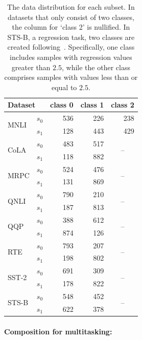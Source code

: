\begin{table}[]
\caption{The data distribution for each subset. 
In datasets that only consist of two classes, the column for `class 2' is nullified.
In STS-B, a regression task, two classes are created following~\citet{matena2022merging}.
Specifically, one class includes samples with regression values greater than $2.5$, while the other class comprises samples with values less than or equal to $2.5$. 
}
\label{table:split0}
\centering
\begin{tabular}{llrrr}
\toprule
\multicolumn{2}{l}{Dataset} & class 0 & class 1 & class 2 \\ \midrule
\multirow{2}{*}{MNLI} & $s_0$ & 536 & 226 & 238 \\
 & $s_1$ & 128 & 443 & 429 \\
\multirow{2}{*}{CoLA} & $s_0$ & 483 & 517 & \multicolumn{1}{c}{\multirow{2}{*}{--}} \\
 & $s_1$ & 118 & 882 &  \\
\multirow{2}{*}{MRPC} & $s_0$ & 524 & 476 & \multicolumn{1}{c}{\multirow{2}{*}{--}} \\
 & $s_1$ & 131 & 869 &  \\
\multirow{2}{*}{QNLI} & $s_0$ & 790 & 210 & \multicolumn{1}{c}{\multirow{2}{*}{--}} \\
 & $s_1$ & 187 & 813 &  \\
\multirow{2}{*}{QQP} & $s_0$ & 388 & 612 &  \multicolumn{1}{c}{\multirow{2}{*}{--}} \\
 & $s_1$ & 874 & 126 &  \\
\multirow{2}{*}{RTE} & $s_0$ & 793 & 207 &  \multicolumn{1}{c}{\multirow{2}{*}{--}} \\
 & $s_1$ & 198 & 802 &  \\
\multirow{2}{*}{SST-2} & $s_0$ & 691 & 309 & \multicolumn{1}{c}{\multirow{2}{*}{--}} \\
 & $s_1$ & 178 & 822 &  \\
\multirow{2}{*}{STS-B} & $s_0$ & 548 & 452 & \multicolumn{1}{c}{\multirow{2}{*}{--}} \\
 & $s_1$ & 622 & 378 &  \\ \bottomrule
\end{tabular}
\end{table}

\paragraph{Composition for multitasking:}

